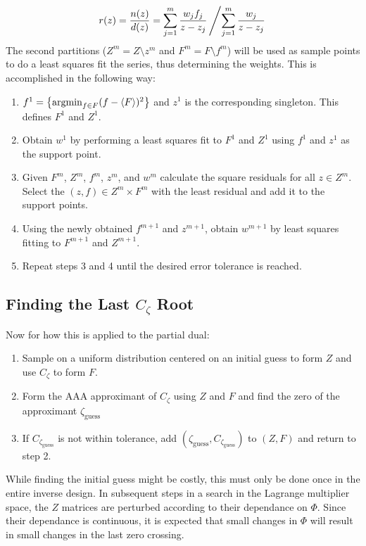 \documentclass[reprint]{revtex4-2}
\DeclareMathOperator*{\argmin}{argmin}
\begin{document}
\begin{align}
    r(z) = \frac{n(z)}{d(z)}=\sum_{j=1}^m\frac{w_jf_j}{z-z_j}\left/ \sum_{j=1}^m\frac{w_j}{z-z_j}\right.
\end{align}
The second partitions ($Z^m = Z\setminus z^m$ and $F^m = F\setminus f^m$) will be used as sample points to do a least squares fit the series, thus determining the weights. This is accomplished in the following way:
\begin{enumerate}
    \item $f^1 = \qty{\argmin_{f\in F}(f-\ev{F})^2}$ and $z^1$ is the corresponding singleton. This defines $F^1$ and $Z^1$.
    \item Obtain $w^1$ by performing a least squares fit to $F^1$ and $Z^1$ using $f^1$ and $z^1$ as the support point.
    \item Given $F^m$, $Z^m$, $f^m$, $z^m$, and $w^m$ calculate the square residuals for all $z\in Z^m$. Select the $(z, f)\in Z^m\times F^m$ with the least residual and add it to the support points.
    \item Using the newly obtained $f^{m+1}$ and $z^{m+1}$, obtain $w^{m+1}$ by least squares fitting to $F^{m+1}$ and $Z^{m+1}$.
    \item Repeat steps 3 and 4 until the desired error tolerance is reached.
\end{enumerate}

\subsection{Finding the Last $C_\zeta$ Root}
Now for how this is applied to the partial dual:

\begin{enumerate}
    \item Sample on a uniform distribution centered on an initial guess to form $Z$ and use $C_\zeta$ to form $F$.
    \item Form the AAA approximant of $C_\zeta$ using $Z$ and $F$ and find the zero of the approximant $\zeta_\text{guess}$
    \item If $C_{\zeta_\text{guess}}$ is not within tolerance, add $(\zeta_\text{guess}, C_{\zeta_\text{guess}})$ to $(Z, F)$ and return to step 2.
\end{enumerate}
While finding the initial guess might be costly, this must only be done once in the entire inverse design. In subsequent steps in a search in the Lagrange multiplier space, the $Z$ matrices are perturbed according to their dependance on $\Phi$. Since their dependance is continuous, it is expected that small changes in $\Phi$ will result in small changes in the last zero crossing.
\end{document}
